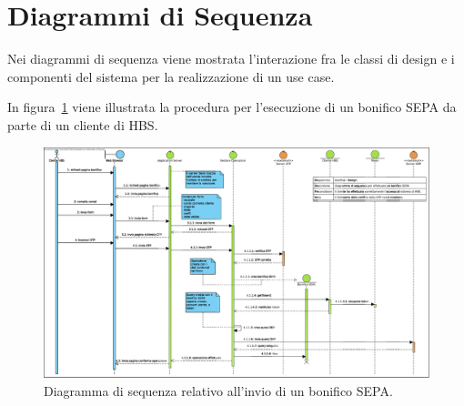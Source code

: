 
\section{Diagrammi di Sequenza}

Nei diagrammi di sequenza viene mostrata l'interazione fra le classi di design e i componenti del sistema per la realizzazione di un use case.

In figura~\ref{fig:sequenza:bonifico-sepa} viene illustrata la procedura per l'esecuzione di un bonifico SEPA da parte di un cliente di HBS.

\begin{figure}[h]
    \centering
	\includegraphics[width=\textheight, angle=90]{Images/Bonifico_-_Design.eps}
    \caption{Diagramma di sequenza relativo all'invio di un bonifico SEPA.}
    \label{fig:sequenza:bonifico-sepa}
\end{figure}


